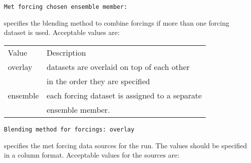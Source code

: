  \begin{Verbatim}[frame=single]
Met forcing chosen ensemble member:
 \end{Verbatim}

 
  specifies the
 blending method to combine forcings if more than one 
 forcing dataset is used. 
 Acceptable values are:

 \begin{tabular}{ll}
 Value    & Description                                    \\
 overlay  & datasets are overlaid on top of each other     \\
          & in the order they are specified                \\
 ensemble & each forcing dataset is assigned to a separate \\
          & ensemble member.                               \\
 \end{tabular}
 

 \begin{Verbatim}[frame=single]
Blending method for forcings: overlay
 \end{Verbatim}

 
  specifies the met forcing 
 data sources for the run. The values should be specified in a column 
 format.
 Acceptable values for the sources are:

